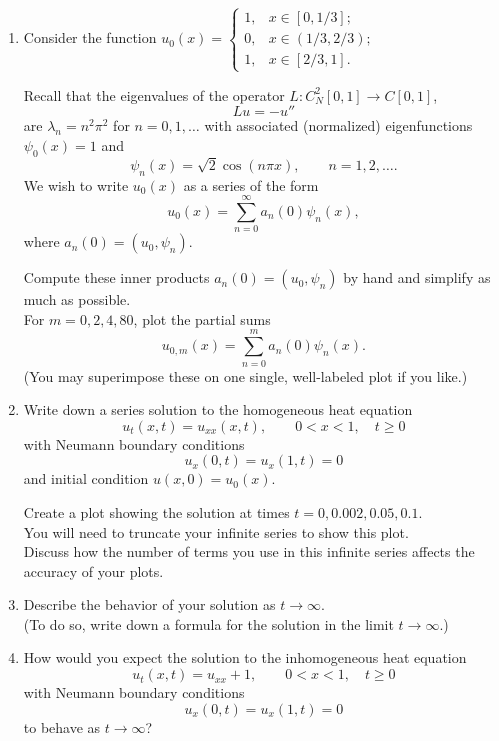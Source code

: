 \begin{enumerate}
\item
Consider the function 
${\displaystyle{u_0(x) = \left\{\begin{array}{ll}
                      1,  & x \in [0,1/3]; \\
                      0,  & x \in (1/3,2/3); \\
                      1,  & x \in [2/3,1].
              \end{array}\right.}}$

Recall that the eigenvalues of the operator $L: C_N^2[0,1] \to C[0,1]$,
          \[ L u = -u'' \]
      are $\lambda_n = n^2 \pi^2$ for $n=0, 1, \ldots$ 
      with associated (normalized) eigenfunctions $\psi_0(x) = 1$ and 
      \[ \psi_n(x) = \sqrt{2} \cos(n\pi x), \qquad n = 1, 2, \ldots.\]
      We wish to write $u_0(x)$ as a series of the form
           \[ u_0(x) = \sum_{n=0}^\infty a_n(0) \psi_n(x),\]
      where $a_n(0) = (u_0, \psi_n)$.

      Compute these inner products $a_n(0) = (u_0, \psi_n)$ 
      by hand and simplify as much as possible.\\
      For $m = 0, 2, 4, 80$, plot the partial sums 
           \[ u_{0,m}(x) = \sum_{n=0}^m a_n(0) \psi_n(x).\]
      (You may superimpose these on one single, well-labeled plot if you like.)

\item Write down a series solution to the homogeneous heat equation
\[ u_t(x,t) = u_{xx}(x,t), \qquad 0<x<1, \quad t\ge 0 \]
with Neumann boundary conditions
\[ u_x(0,t) = u_x(1,t) = 0\]
and initial condition $u(x,0) = u_0(x)$.

Create a plot showing the solution at times $t=0, 0.002, 0.05, 0.1$.\\
You will need to truncate your infinite series to show this plot.\\
Discuss how the number of terms you use in this infinite series 
affects the accuracy of your plots.

\vspace*{1em}
\item Describe the behavior of your solution as $t\to \infty$.\\
      (To do so, write down a formula for the solution in the limit $t\to\infty$.)

\vspace*{1em}
\item How would you expect the solution to the inhomogeneous heat equation
\[ u_t(x,t) = u_{xx}+ 1, \qquad 0<x<1, \quad t\ge 0 \]
with Neumann boundary conditions
\[ u_x(0,t) = u_x(1,t) = 0\]
to behave as $t\to\infty$?
\end{enumerate}

